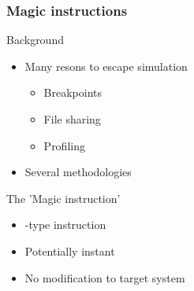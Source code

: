 
\begin{frame}
\frametitle{Magic instructions}

\begin{block}{Background}
	\begin{itemize}
		\item Many resons to escape simulation
		\begin{itemize}
			\item Breakpoints
			\item File sharing
			\item Profiling
		\end{itemize}
		\item Several methodologies
	\end{itemize}
\end{block}

\begin{block}{The 'Magic instruction'}
	\begin{itemize}
		\item {}-type instruction\footnotemark
		\item Potentially instant
		\item No modification to target system
	\end{itemize}
\end{block}


\end{frame}
